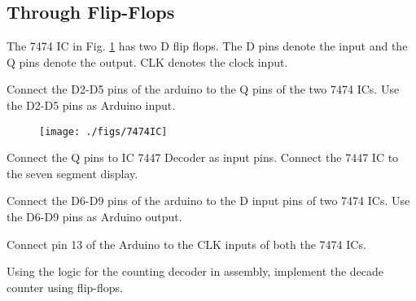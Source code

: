 \subsection{Through Flip-Flops}
%
%
%	
The 7474 IC in Fig. \ref{fig:7474IC} has two D flip flops.  The D pins denote the input and the Q pins denote the output. CLK denotes the clock input.
%
\begin{problem}
%
Connect the D2-D5 pins of the arduino to the Q pins of the two 7474 ICs. Use the D2-D5 pins as Arduino input.
\end{problem}
\begin{figure}[!h]
\begin{center}
\texttt{[image: ./figs/7474IC]}
\end{center}
\caption{}
\label{fig:7474IC}
\end{figure}
%
\begin{problem}
Connect the Q pins to IC 7447 Decoder as input pins.  Connect the 7447 IC to the seven segment display.
\end{problem}
\begin{problem}
Connect the D6-D9 pins of the arduino to the D input pins of two 7474 ICs. Use the D6-D9 pins as Arduino output.
\end{problem}
\begin{problem}
Connect pin 13 of the Arduino to the CLK inputs of both the 7474 ICs.
\end{problem}
\begin{problem}
Using the logic for the counting decoder in assembly, implement the decade counter using flip-flops.
\end{problem}




